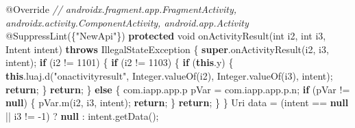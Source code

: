 \documentclass[
]{article}
\newenvironment{Shaded}{}{}
\newcommand{\AttributeTok}[1]{\textcolor[rgb]{0.49,0.56,0.16}{#1}}
\newcommand{\BuiltInTok}[1]{\textcolor[rgb]{0.00,0.50,0.00}{#1}}
\newcommand{\CommentTok}[1]{\textcolor[rgb]{0.38,0.63,0.69}{\textit{#1}}}
\newcommand{\ControlFlowTok}[1]{\textcolor[rgb]{0.00,0.44,0.13}{\textbf{#1}}}
\newcommand{\DataTypeTok}[1]{\textcolor[rgb]{0.56,0.13,0.00}{#1}}
\newcommand{\DecValTok}[1]{\textcolor[rgb]{0.25,0.63,0.44}{#1}}
\newcommand{\FunctionTok}[1]{\textcolor[rgb]{0.02,0.16,0.49}{#1}}
\newcommand{\KeywordTok}[1]{\textcolor[rgb]{0.00,0.44,0.13}{\textbf{#1}}}
\newcommand{\NormalTok}[1]{#1}
\newcommand{\OperatorTok}[1]{\textcolor[rgb]{0.40,0.40,0.40}{#1}}
\newcommand{\StringTok}[1]{\textcolor[rgb]{0.25,0.44,0.63}{#1}}
\begin{document}
\begin{Shaded}
\begin{Highlighting}[]
    \AttributeTok{@Override} \CommentTok{// androidx.fragment.app.FragmentActivity, androidx.activity.ComponentActivity, android.app.Activity}
    \AttributeTok{@SuppressLint}\OperatorTok{(\{}\StringTok{"NewApi"}\OperatorTok{\})}
    \KeywordTok{protected} \DataTypeTok{void} \FunctionTok{onActivityResult}\OperatorTok{(}\DataTypeTok{int}\NormalTok{ i2}\OperatorTok{,} \DataTypeTok{int}\NormalTok{ i3}\OperatorTok{,}\NormalTok{ Intent intent}\OperatorTok{)} \KeywordTok{throws} \BuiltInTok{IllegalStateException} \OperatorTok{\{}
        \KeywordTok{super}\OperatorTok{.}\FunctionTok{onActivityResult}\OperatorTok{(}\NormalTok{i2}\OperatorTok{,}\NormalTok{ i3}\OperatorTok{,}\NormalTok{ intent}\OperatorTok{);}
        \ControlFlowTok{if} \OperatorTok{(}\NormalTok{i2 }\OperatorTok{!=} \DecValTok{1101}\OperatorTok{)} \OperatorTok{\{}
            \ControlFlowTok{if} \OperatorTok{(}\NormalTok{i2 }\OperatorTok{!=} \DecValTok{1103}\OperatorTok{)} \OperatorTok{\{}
                \ControlFlowTok{if} \OperatorTok{(}\KeywordTok{this}\OperatorTok{.}\FunctionTok{y}\OperatorTok{)} \OperatorTok{\{}
                    \KeywordTok{this}\OperatorTok{.}\FunctionTok{luaj}\OperatorTok{.}\FunctionTok{d}\OperatorTok{(}\StringTok{"onactivityresult"}\OperatorTok{,} \BuiltInTok{Integer}\OperatorTok{.}\FunctionTok{valueOf}\OperatorTok{(}\NormalTok{i2}\OperatorTok{),} \BuiltInTok{Integer}\OperatorTok{.}\FunctionTok{valueOf}\OperatorTok{(}\NormalTok{i3}\OperatorTok{),}\NormalTok{ intent}\OperatorTok{);}
                    \ControlFlowTok{return}\OperatorTok{;}
                \OperatorTok{\}}
                \ControlFlowTok{return}\OperatorTok{;}
            \OperatorTok{\}} \ControlFlowTok{else} \OperatorTok{\{}
\NormalTok{                com}\OperatorTok{.}\FunctionTok{iapp}\OperatorTok{.}\FunctionTok{app}\OperatorTok{.}\FunctionTok{p}\NormalTok{ pVar }\OperatorTok{=}\NormalTok{ com}\OperatorTok{.}\FunctionTok{iapp}\OperatorTok{.}\FunctionTok{app}\OperatorTok{.}\FunctionTok{p}\OperatorTok{.}\FunctionTok{n}\OperatorTok{;}
                \ControlFlowTok{if} \OperatorTok{(}\NormalTok{pVar }\OperatorTok{!=} \KeywordTok{null}\OperatorTok{)} \OperatorTok{\{}
\NormalTok{                    pVar}\OperatorTok{.}\FunctionTok{m}\OperatorTok{(}\NormalTok{i2}\OperatorTok{,}\NormalTok{ i3}\OperatorTok{,}\NormalTok{ intent}\OperatorTok{);}
                    \ControlFlowTok{return}\OperatorTok{;}
                \OperatorTok{\}}
                \ControlFlowTok{return}\OperatorTok{;}
            \OperatorTok{\}}
        \OperatorTok{\}}
\NormalTok{        Uri data }\OperatorTok{=} \OperatorTok{(}\NormalTok{intent }\OperatorTok{==} \KeywordTok{null} \OperatorTok{||}\NormalTok{ i3 }\OperatorTok{!=} \OperatorTok{{-}}\DecValTok{1}\OperatorTok{)} \OperatorTok{?} \KeywordTok{null} \OperatorTok{:}\NormalTok{ intent}\OperatorTok{.}\FunctionTok{getData}\OperatorTok{();}

\end{Highlighting}
\end{Shaded}
\end{document}
